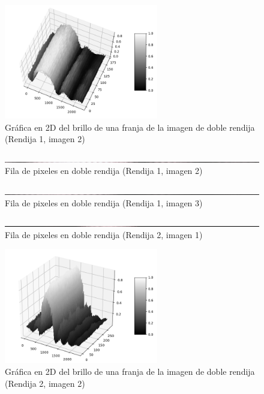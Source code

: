 \documentclass[12p]{article}
\begin{document}
\begin{figure}[h]
  \includegraphics[width=0.6\textwidth]{2_2D.png}
  \centering
  \caption{Gráfica en 2D del brillo de una franja de la imagen de doble rendija (Rendija 1, imagen 2)}
\end{figure} 

\begin{figure}[h]
  \includegraphics[width=1.0\textwidth]{2p.png}
  \centering
  \caption{Fila de pixeles en doble rendija (Rendija 1, imagen 2)}
\end{figure} 

\begin{figure}[h]
  \includegraphics[width=1.0\textwidth]{3p.png}
  \centering
  \caption{Fila de pixeles en doble rendija (Rendija 1, imagen 3)}
\end{figure}

\begin{figure}[h]
  \includegraphics[width=1.0\textwidth]{ap.png}
  \centering
  \caption{Fila de pixeles en doble rendija (Rendija 2, imagen 1)}
\end{figure} 

\begin{figure}[h]
  \includegraphics[width=0.6\textwidth]{b_2D.png}
  \centering
  \caption{Gráfica en 2D del brillo de una franja de la imagen de doble rendija (Rendija 2, imagen 2)}
\end{figure} 
\end{document}

